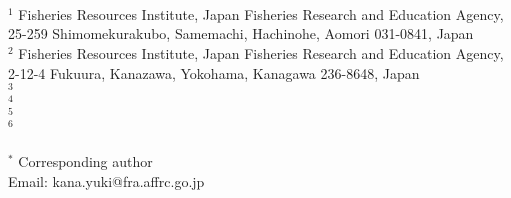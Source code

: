 \documentclass[12pt]{article}
\begin{document}
\setcounter{page}{1}
\renewcommand\citeleft{(}
\renewcommand\citeright{)}

\\
\\
\ \\
$^{1}$ Fisheries Resources Institute, Japan Fisheries Research and Education Agency, 25-259 Shimomekurakubo, Samemachi, Hachinohe, Aomori 031-0841, Japan\\
$^{2}$ Fisheries Resources Institute, Japan Fisheries Research and Education Agency, 2-12-4 Fukuura, Kanazawa, Yokohama, Kanagawa 236-8648, Japan\\
$^{3}$ \\
$^{4}$ \\
$^{5}$ \\
$^{6}$ \\
\ \\

$^{\ast}$ Corresponding author\\
Email: kana.yuki@fra.affrc.go.jp

\newpage
{}


\\
\end{document}
